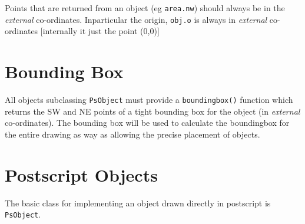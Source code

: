 \documentclass[a4paper]{book}
\begin{document}
Points that are returned from an object (eg \Verb|area.nw|) should
always be in the \emph{external} co-ordinates. Inparticular the origin,
\Verb|obj.o| is always in \emph{external} co-ordinates [internally it
just the point (0,0)]

\section{Bounding Box}
\label{sec:bounding-box}

All objects subclassing \Verb|PsObject| must provide a \Verb|boundingbox()|
function which returns the SW and NE points of a tight bounding box for the
object (in \emph{external} co-ordinates). The bounding box will be used
to calculate the boundingbox for the entire drawing as way as allowing
the precise placement of objects.


\section{Postscript Objects}
\label{sec:postscript-objects}

The basic class for implementing an object drawn directly in postscript
is \Verb|PsObject|. 

\appendix




\end{document}
